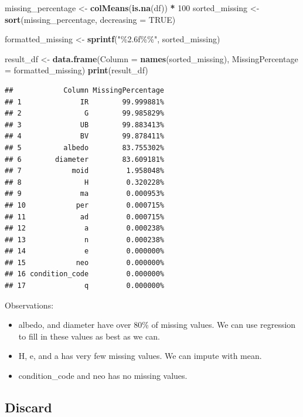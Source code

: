 \documentclass[
]{article}
\newenvironment{Shaded}{\begin{snugshade}}{\end{snugshade}}
\newcommand{\AttributeTok}[1]{\textcolor[rgb]{0.13,0.29,0.53}{#1}}
\newcommand{\ConstantTok}[1]{\textcolor[rgb]{0.56,0.35,0.01}{#1}}
\newcommand{\DecValTok}[1]{\textcolor[rgb]{0.00,0.00,0.81}{#1}}
\newcommand{\FunctionTok}[1]{\textcolor[rgb]{0.13,0.29,0.53}{\textbf{#1}}}
\newcommand{\NormalTok}[1]{#1}
\newcommand{\OtherTok}[1]{\textcolor[rgb]{0.56,0.35,0.01}{#1}}
\newcommand{\SpecialCharTok}[1]{\textcolor[rgb]{0.81,0.36,0.00}{\textbf{#1}}}
\newcommand{\StringTok}[1]{\textcolor[rgb]{0.31,0.60,0.02}{#1}}
\begin{document}
\begin{Shaded}
\begin{Highlighting}[]
\NormalTok{missing\_percentage }\OtherTok{\textless{}{-}} \FunctionTok{colMeans}\NormalTok{(}\FunctionTok{is.na}\NormalTok{(df)) }\SpecialCharTok{*} \DecValTok{100}
\NormalTok{sorted\_missing }\OtherTok{\textless{}{-}} \FunctionTok{sort}\NormalTok{(missing\_percentage, }\AttributeTok{decreasing =} \ConstantTok{TRUE}\NormalTok{)}

\NormalTok{formatted\_missing }\OtherTok{\textless{}{-}} \FunctionTok{sprintf}\NormalTok{(}\StringTok{"\%2.6f\%\%"}\NormalTok{, sorted\_missing)}

\NormalTok{result\_df }\OtherTok{\textless{}{-}} \FunctionTok{data.frame}\NormalTok{(}\AttributeTok{Column =} \FunctionTok{names}\NormalTok{(sorted\_missing), }
                        \AttributeTok{MissingPercentage =}\NormalTok{ formatted\_missing)}
\FunctionTok{print}\NormalTok{(result\_df)}
\end{Highlighting}
\end{Shaded}

\begin{verbatim}
##            Column MissingPercentage
## 1              IR        99.999881%
## 2               G        99.985829%
## 3              UB        99.883413%
## 4              BV        99.878411%
## 5          albedo        83.755302%
## 6        diameter        83.609181%
## 7            moid         1.958048%
## 8               H         0.320228%
## 9              ma         0.000953%
## 10            per         0.000715%
## 11             ad         0.000715%
## 12              a         0.000238%
## 13              n         0.000238%
## 14              e         0.000000%
## 15            neo         0.000000%
## 16 condition_code         0.000000%
## 17              q         0.000000%
\end{verbatim}

Observations:

\begin{itemize}
\item
  albedo, and diameter have over 80\% of missing values. We can use
  regression to fill in these values as best as we can.
\item
  H, e, and a has very few missing values. We can impute with mean.
\item
  condition\_code and neo has no missing values.
\end{itemize}

\hypertarget{discard}{%
\subsection{Discard}\label{discard}}
\end{document}
